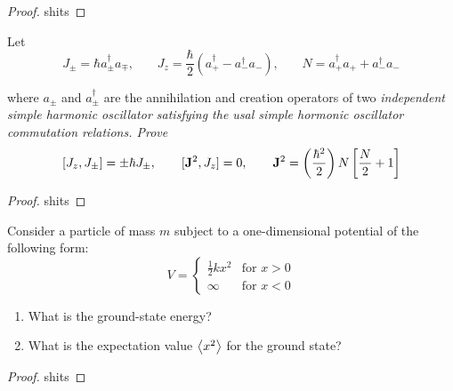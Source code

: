 \begin{proof}

    shits

\end{proof}


\begin{exer}[2.20]

    Let
    \[
        J_{\pm} = \hbar a^{\dagger}_{\pm} a_{\mp}\text{,} \qquad
        J_z = \frac{\hbar}{2}\left(a^{\dagger}_{+} - a^{\dagger}_{-}
        a_{-}\right)\text{,} \qquad
        N = a^{\dagger}_{+}a_+ + a^{\dagger}_{-} a_-
    \]
    
    where $a_{\pm}$ and $a^{\dagger}_{\pm}$ are the annihilation and
    creation operators of two \it{independent} simple harmonic
    oscillator satisfying the usal simple hormonic oscillator
    commutation relations. Prove
    \[
        [J_z, J_{\pm}] = \pm \hbar J_\pm , \qquad
        [\mathbf{J}^2, J_z] = 0, \qquad
        \mathbf{J}^2 = \left(\frac{\hbar^2}{2}\right) N \left[ \frac{N}{2} +
        1 \right]
    \]

\end{exer}

\begin{proof}

    shits

\end{proof}


\begin{exer}[2.22]

    Consider a particle of mass $m$ subject to a one-dimensional
    potential of the following form:
    \[
        V =
        \begin{cases}
            \frac{1}{2} k x^2 & \text{for } x > 0\\
            \infty & \text{for } x < 0
        \end{cases}
    \]
    \begin{enumerate}
        \item What is the ground-state energy?
        \item What is the expectation value $\left< x^2 \right>$ for the ground
            state?
    \end{enumerate}

\end{exer}

\begin{proof}

    shits

\end{proof}


